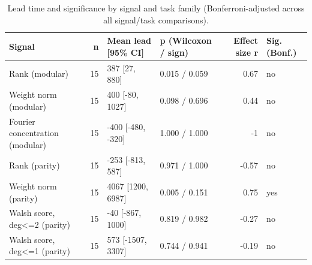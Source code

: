 \begin{table}
\caption{Lead time and significance by signal and task family (Bonferroni-adjusted across all signal/task comparisons).}
\label{tab:h2}
\begin{tabular}{lrllrl}
\toprule
Signal & n & Mean lead [95\% CI] & p (Wilcoxon / sign) & Effect size r & Sig. (Bonf.) \\
\midrule
Rank (modular) & 15 & 387 [27, 880] & 0.015 / 0.059 & 0.67 & no \\
Weight norm (modular) & 15 & 400 [-80, 1027] & 0.098 / 0.696 & 0.44 & no \\
Fourier concentration (modular) & 15 & -400 [-480, -320] & 1.000 / 1.000 & -1 & no \\
Rank (parity) & 15 & -253 [-813, 587] & 0.971 / 1.000 & -0.57 & no \\
Weight norm (parity) & 15 & 4067 [1200, 6987] & 0.005 / 0.151 & 0.75 & yes \\
Walsh score, deg<=2 (parity) & 15 & -40 [-867, 1000] & 0.819 / 0.982 & -0.27 & no \\
Walsh score, deg<=1 (parity) & 15 & 573 [-1507, 3307] & 0.744 / 0.941 & -0.19 & no \\
\bottomrule
\end{tabular}
\end{table}
